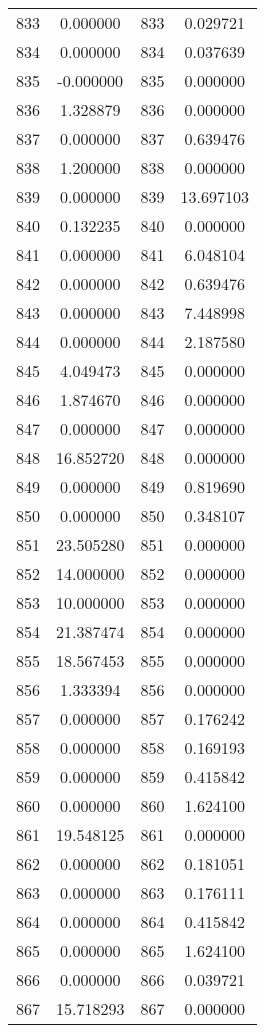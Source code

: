 \documentclass[12pt]{article}
\begin{document}
\begin{longtable}{@{}cccc@{}}
833 & 0.000000 & 833 & 0.029721 \\
834 & 0.000000 & 834 & 0.037639 \\
835 & -0.000000 & 835 & 0.000000 \\
836 & 1.328879 & 836 & 0.000000 \\
837 & 0.000000 & 837 & 0.639476 \\
838 & 1.200000 & 838 & 0.000000 \\
839 & 0.000000 & 839 & 13.697103 \\
840 & 0.132235 & 840 & 0.000000 \\
841 & 0.000000 & 841 & 6.048104 \\
842 & 0.000000 & 842 & 0.639476 \\
843 & 0.000000 & 843 & 7.448998 \\
844 & 0.000000 & 844 & 2.187580 \\
845 & 4.049473 & 845 & 0.000000 \\
846 & 1.874670 & 846 & 0.000000 \\
847 & 0.000000 & 847 & 0.000000 \\
848 & 16.852720 & 848 & 0.000000 \\
849 & 0.000000 & 849 & 0.819690 \\
850 & 0.000000 & 850 & 0.348107 \\
851 & 23.505280 & 851 & 0.000000 \\
852 & 14.000000 & 852 & 0.000000 \\
853 & 10.000000 & 853 & 0.000000 \\
854 & 21.387474 & 854 & 0.000000 \\
855 & 18.567453 & 855 & 0.000000 \\
856 & 1.333394 & 856 & 0.000000 \\
857 & 0.000000 & 857 & 0.176242 \\
858 & 0.000000 & 858 & 0.169193 \\
859 & 0.000000 & 859 & 0.415842 \\
860 & 0.000000 & 860 & 1.624100 \\
861 & 19.548125 & 861 & 0.000000 \\
862 & 0.000000 & 862 & 0.181051 \\
863 & 0.000000 & 863 & 0.176111 \\
864 & 0.000000 & 864 & 0.415842 \\
865 & 0.000000 & 865 & 1.624100 \\
866 & 0.000000 & 866 & 0.039721 \\
867 & 15.718293 & 867 & 0.000000 \\

\end{longtable}
\end{document}
